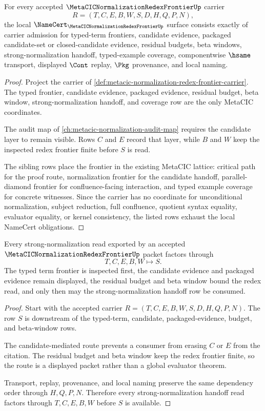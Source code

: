 \begin{theorem}
\label{thm:metacic-normalization-redex-frontier-namecert-obligations}
For every accepted $\MetaCICNormalizationRedexFrontierUp$ carrier
$$
R=(T,C,E,B,W,S,D,H,Q,P,N),
$$
the local $\NameCert_{\MetaCICNormalizationRedexFrontierUp}$ surface consists exactly of carrier admission for typed-term frontiers, candidate evidence, packaged candidate-set or closed-candidate evidence, residual budgets, beta windows, strong-normalization handoff, typed-example coverage, componentwise $\hsame$ transport, displayed $\Cont$ replay, $\Pkg$ provenance, and local naming.
\end{theorem}
\begin{proof}
Project the carrier of \autoref{def:metacic-normalization-redex-frontier-carrier}. The typed frontier, candidate evidence, packaged evidence, residual budget, beta window, strong-normalization handoff, and coverage row are the only MetaCIC coordinates.

The audit map of \autoref{ch:metacic-normalization-audit-map} requires the candidate layer to remain visible. Rows $C$ and $E$ record that layer, while $B$ and $W$ keep the inspected redex frontier finite before $S$ is read.

The sibling rows place the frontier in the existing MetaCIC lattice: critical path for the proof route, normalization frontier for the candidate handoff, parallel-diamond frontier for confluence-facing interaction, and typed example coverage for concrete witnesses. Since the carrier has no coordinate for unconditional normalization, subject reduction, full confluence, quotient syntax equality, evaluator equality, or kernel consistency, the listed rows exhaust the local NameCert obligations.
\end{proof}

\begin{theorem}
\label{thm:metacic-normalization-redex-frontier-candidate-handoff}
Every strong-normalization read exported by an accepted $\MetaCICNormalizationRedexFrontierUp$ packet factors through
$$
T,C,E,B,W \longmapsto S.
$$
The typed term frontier is inspected first, the candidate evidence and packaged evidence remain displayed, the residual budget and beta window bound the redex read, and only then may the strong-normalization handoff row be consumed.
\end{theorem}
\begin{proof}
Start with the accepted carrier $R=(T,C,E,B,W,S,D,H,Q,P,N)$. The row $S$ is downstream of the typed-term, candidate, packaged-evidence, budget, and beta-window rows.

The candidate-mediated route prevents a consumer from erasing $C$ or $E$ from the citation. The residual budget and beta window keep the redex frontier finite, so the route is a displayed packet rather than a global evaluator theorem.

Transport, replay, provenance, and local naming preserve the same dependency order through $H,Q,P,N$. Therefore every strong-normalization handoff read factors through $T,C,E,B,W$ before $S$ is available.
\end{proof}


